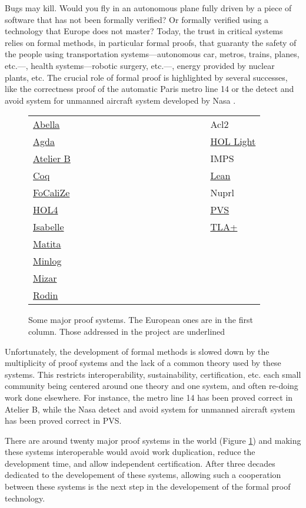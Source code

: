 Bugs may kill. Would you fly in an autonomous plane fully driven by a
piece of software that has not been formally verified?  Or formally
verified using a technology that Europe does not master? Today, the
trust in critical systems relies on formal methods, in particular
formal proofs, that guaranty the safety of the people using
transportation systems---autonomous car, metros, trains, planes,
etc.---, health systems---robotic surgery, etc.---, energy provided by
nuclear plants, etc. The crucial role of formal proof is highlighted
by several successes, like the correctness proof of the automatic
Paris metro line 14 \cite{metro14} or the detect and avoid system for
unmanned aircraft system developed by Nasa \cite{Munoz16}.

\thispagestyle{empty}

\begin{figure}
\begin{tabular}{ll}
  {\sc \underline{Abella}}~~~~~~~~~~~~~~~~~~~~~~~~~~~~~~&{\sc Acl2}\\
{\sc \underline{Agda}} &  {\sc \underline{HOL Light}}\\
{\sc \underline{Atelier B}} &  {\sc IMPS}\\
{\sc \underline{Coq}}  &  {\sc \underline{Lean}}\\
{\sc \underline{FoCaliZe}}  &  {\sc Nuprl}\\
{\sc \underline{HOL4}}  &  {\sc \underline{PVS}}\\
{\sc \underline{Isabelle}}  &  {\sc \underline{TLA+}}\\
{\sc \underline{Matita}}\\
{\sc \underline{Minlog}}\\
{\sc \underline{Mizar}}\\
{\sc \underline{Rodin}}\\
\end{tabular}
\caption{Some major proof systems. The European ones are in the first column.
  Those addressed in the project are underlined\label{systems}}
\end{figure}

Unfortunately, the development of formal methods is slowed down by the
multiplicity of proof systems and the lack of a common theory used by
these systems. This restricts interoperability, sustainability,
certification, etc.  each small community being centered around one
theory and one system, and often re-doing work done elsewhere.  For
instance, the metro line 14 has been proved correct in {\sc Atelier
B}, while the Nasa detect and avoid system for unmanned aircraft
system has been proved correct in {\sc PVS}.

There are around twenty major proof systems in the world
(Figure \ref{systems}) and making these systems interoperable would avoid work
duplication, reduce the development time, and allow independent
certification.  After three decades dedicated to the developement of
these systems, allowing such a cooperation between these systems is
the next step in the developement of the formal proof technology.

